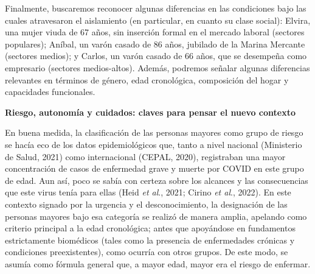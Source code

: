 Finalmente, buscaremos reconocer algunas diferencias en las condiciones bajo las cuales atravesaron el aislamiento (en particular, en cuanto su clase social): Elvira, una mujer viuda de 67 años, sin inserción formal en el mercado laboral (sectores populares); Aníbal, un varón casado de 86 años, jubilado de la Marina Mercante (sectores medios); y Carlos, un varón casado de 66 años, que se desempeña como empresario (sectores medios-altos). Además, podremos señalar algunas diferencias relevantes en términos de género, edad cronológica, composición del hogar y capacidades funcionales.

\textbf{Riesgo, autonomía y cuidados: claves para pensar el nuevo contexto}

En buena medida, la clasificación de las personas mayores como grupo de riesgo se hacía eco de los datos epidemiológicos que, tanto a nivel nacional (Ministerio de Salud, 2021) como internacional (CEPAL, 2020), registraban una mayor concentración de casos de enfermedad grave y muerte por COVID en este grupo de edad. Aun así, poco se sabía con certeza sobre los alcances y las consecuencias que este virus tenía para ellas (Heid \emph{et al}., 2021; Cirino \emph{et al}., 2022). En este contexto signado por la urgencia y el desconocimiento, la designación de las personas mayores bajo esa categoría se realizó de manera amplia, apelando como criterio principal a la edad cronológica; antes que apoyándose en fundamentos estrictamente biomédicos (tales como la presencia de enfermedades crónicas y condiciones preexistentes), como ocurría con otros grupos. De este modo, se asumía como fórmula general que, a mayor edad, mayor era el riesgo de enfermar.

